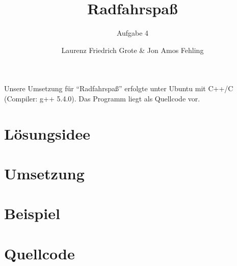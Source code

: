 \documentclass[parskip=full, DIV=14]{scrartcl}
\begin{document}
	\titlehead{35. Bundeswettbewerb Informatik \hfill Team 00001, Teilnahme 6745}
	\title{Radfahrspaß}
	\subtitle{Aufgabe 4}
	\author{Laurenz Friedrich Grote \& Jon Amos Fehling}
	\date{}
	\maketitle
	\tableofcontents
	
	\vspace {3em}
	Unsere Umsetzung für "`Radfahrspaß"' erfolgte unter Ubuntu mit C++/C (Compiler: g++ 5.4.0). Das Programm liegt als Quellcode vor.
	\clearpage
	\section{Lösungsidee}
		

	\section{Umsetzung}
		
	\clearpage
	\section{Beispiel}
		
	\clearpage
	\section{Quellcode}
		
\end{document}
